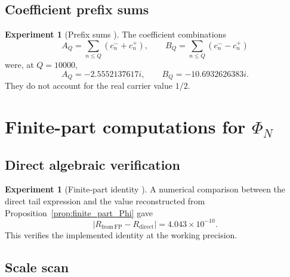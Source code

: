 \documentclass[11pt]{amsart}
\numberwithin{equation}{section}
\theoremstyle{plain}
\theoremstyle{definition}
\newtheorem{experiment}[theorem]{Experiment}
\theoremstyle{remark}
\newcommand{\1}{\mathbf{1}}
\begin{document}
\subsection{Coefficient prefix sums}
\label{subsec:numerical_coefficient_prefixes}

\begin{experiment}[Prefix sums {\normalfont[Numerical]}]
\label{exp:numerical_prefix_sums}
The coefficient combinations
\begin{equation}
A_Q=\sum_{n\leq Q}(c_n^-+c_n^+),
\qquad
B_Q=\sum_{n\leq Q}(c_n^--c_n^+)
\label{eq:numerical_AQ_BQ}
\end{equation}
were, at $Q=10000$,
\begin{equation}
A_Q=-2.5552137617i,
\qquad
B_Q=-10.6932626383i.
\label{eq:numerical_AQ_BQ_values_detailed}
\end{equation}
They do not account for the real carrier value $1/2$.
\end{experiment}

\section{Finite-part computations for \texorpdfstring{\(\Phi_N\)}{Phi N}}
\label{sec:numerical_finite_parts}

\subsection{Direct algebraic verification}
\label{subsec:numerical_finite_part_verification}

\begin{experiment}[Finite-part identity {\normalfont[Numerical]}]
\label{exp:numerical_finite_part_identity}
A numerical comparison between the direct tail expression and the value
reconstructed from Proposition~\ref{prop:finite_part_Phi} gave
\begin{equation}
|R_{\mathrm{from\,FP}}-R_{\mathrm{direct}}|
=4.043\times10^{-10}.
\label{eq:numerical_finite_part_error_detailed}
\end{equation}
This verifies the implemented identity at the working precision.
\end{experiment}

\subsection{Scale scan}
\label{subsec:numerical_finite_part_scale_scan}
\end{document}
